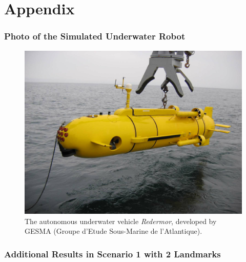 

\chapter{Appendix}

\renewcommand{\thechapter}{A}




\subsection*{Photo of the Simulated Underwater Robot}

\vspace{-0.4cm}

\begin{figure}[h]
	\centering	
	\includegraphics[width=\textwidth]{Figures/redermor.png}			
	\caption[The autonomous underwater vehicle \emph{Redermor} developed by GESMA.]{The autonomous underwater vehicle \emph{Redermor}, developed by GESMA (Groupe d'Etude Sous-Marine de l'Atlantique).}		
	\label{fig:redermor}			
\end{figure}



\subsection*{Additional Results in Scenario 1 with 2 Landmarks}

